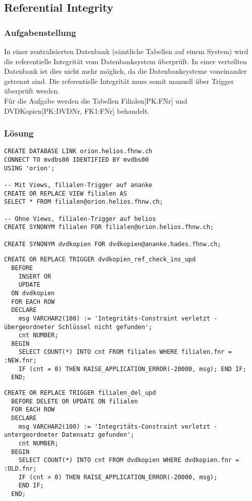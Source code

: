 \documentclass[a4paper,10pt,titlepage=false]{scrreprt}
\begin{document}
\subsection{Referential Integrity}
\subsubsection{Aufgabenstellung}
In einer zentralisierten Datenbank (sämtliche Tabellen auf einem System) wird die referentielle Integrität vom Datenbanksystem überprüft. In einer verteilten Datenbank ist dies nicht mehr möglich, da die Datenbanksysteme voneinander getrennt sind. Die referentielle Integrität muss somit manuell über Trigger überprüft werden.\\
Für die Aufgabe werden die Tabellen Filialen[PK:FNr] und DVDKopien[PK:DVDNr, FK1:FNr] behandelt.
\subsubsection{Lösung}
\begin{lstlisting}[style=sql, title=Link ananke <=> helios]
CREATE DATABASE LINK orion.helios.fhnw.ch
CONNECT TO mvdbs00 IDENTIFIED BY mvdbs00
USING 'orion';

-- Mit Views, filialen-Trigger auf ananke
CREATE OR REPLACE VIEW filialen AS
SELECT * FROM filialen@orion.helios.fhnw.ch;

-- Ohne Views, filialen-Trigger auf helios
CREATE SYNONYM filialen FOR filialen@orion.helios.fhnw.ch;

CREATE SYNONYM dvdkopien FOR dvdkopien@ananke.hades.fhnw.ch;
\end{lstlisting}
\begin{lstlisting}[style=sql, title=FILIALEN-Trigger auf ananke]
CREATE OR REPLACE TRIGGER dvdkopien_ref_check_ins_upd
  BEFORE
    INSERT OR
    UPDATE
  ON dvdkopien
  FOR EACH ROW
  DECLARE
    msg VARCHAR2(100) := 'Integritäts-Constraint verletzt - übergeordneter Schlüssel nicht gefunden';
    cnt NUMBER;
  BEGIN
    SELECT COUNT(*) INTO cnt FROM filialen WHERE filialen.fnr = :NEW.fnr;
    IF (cnt = 0) THEN RAISE_APPLICATION_ERROR(-20000, msg); END IF;
  END;
\end{lstlisting}
\begin{lstlisting}[style=sql, title=DVDKOPIEN-Trigger auf helios]
CREATE OR REPLACE TRIGGER filialen_del_upd
  BEFORE DELETE OR UPDATE ON filialen
  FOR EACH ROW
  DECLARE 
    msg VARCHAR2(100) := 'Integritäts-Constraint verletzt - untergeordneter Datensatz gefunden';
    cnt NUMBER;
  BEGIN
    SELECT COUNT(*) INTO cnt FROM dvdkopien WHERE dvdkopien.fnr = :OLD.fnr;
    IF (cnt > 0) THEN RAISE_APPLICATION_ERROR(-20000, msg);
    END IF;
  END;
\end{lstlisting}
\end{document}
